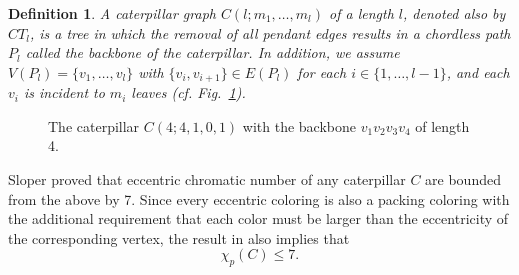 \documentclass{article}
\newtheorem{definition}{Definition}
\begin{document}
\begin{definition}\label{def:caterpillar}
   A caterpillar graph $C(l;m_1,\ldots, m_l)$ \emph{of a length $l$, denoted also by $CT_l$, is a tree in which the removal of all pendant edges results in a chordless path $P_l$ called the \emph{backbone} of the caterpillar. In addition, we assume $V(P_l)=\{v_1,\ldots,v_l\}$ with $\{v_i,v_{i+1}\} \in E(P_l)$ for each $i\in \{1,\ldots,l-1\}$, and each $v_i$ is incident to $m_i$ leaves (cf. Fig.~\ref{fig:caterpillar_ex}).}
\end{definition}


\begin{figure}[H]
\centering
{}
\caption{The caterpillar $C(4;4,1,0,1)$ with the backbone $v_1v_2v_3v_4$ of length 4.}\label{fig:caterpillar_ex}
\end{figure}


Sloper \cite{sloper} proved that eccentric chromatic number of any caterpillar $C$ are bounded from the above by 7. Since every eccentric coloring is also a packing coloring with the additional requirement that each color must be larger than the eccentricity of the corresponding vertex, the result in \cite{sloper} also implies that
$$\chi_p(C)\leq 7.$$
\end{document}
